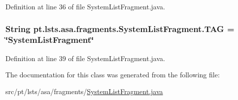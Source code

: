 Definition at line 36 of file System\+List\+Fragment.\+java.

\hypertarget{classpt_1_1lsts_1_1asa_1_1fragments_1_1SystemListFragment_aa32f4be3e58e7efc53b8ea0fff594403}{}
\subsubsection[{T\+A\+G}]{\setlength{\rightskip}{0pt plus 5cm}String pt.\+lsts.\+asa.\+fragments.\+System\+List\+Fragment.\+T\+A\+G = \char`\"{}System\+List\+Fragment\char`\"{}\hspace{0.3cm}{\ttfamily [private]}}\label{classpt_1_1lsts_1_1asa_1_1fragments_1_1SystemListFragment_aa32f4be3e58e7efc53b8ea0fff594403}


Definition at line 39 of file System\+List\+Fragment.\+java.



The documentation for this class was generated from the following file\+:\begin{DoxyCompactItemize}
\item 
src/pt/lsts/asa/fragments/\hyperlink{SystemListFragment_8java}{System\+List\+Fragment.\+java}\end{DoxyCompactItemize}
